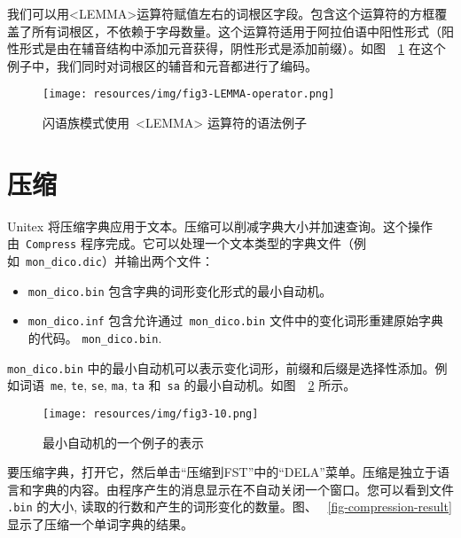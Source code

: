 \bigskip
\noindent 
我们可以用<LEMMA>运算符赋值左右的词根区字段。包含这个运算符的方框覆盖了所有词根区，不依赖于字母数量。这个运算符适用于阿拉伯语中阳性形式（阳性形式是由在辅音结构中添加元音获得，阴性形式是添加前缀）。如图\ ~\ref{LEMMA-operator} 在这个例子中，我们同时对词根区的辅音和元音都进行了编码。


\begin{figure}[!ht]
\begin{center}
\texttt{[image: resources/img/fig3-LEMMA-operator.png]}
\caption{闪语族模式使用\ <LEMMA>\label{LEMMA-operator} 运算符的语法例子}
\end{center}
\end{figure}

\section{压缩}

Unitex 将压缩字典应用于文本。压缩可以削减字典大小并加速查询。这个操作由\ \verb+Compress+ 程序完成。它可以处理一个文本类型的字典文件（例如\ \verb+mon_dico.dic+）并输出两个文件：


\begin{itemize}
  \item \verb+mon_dico.bin+ 包含字典的词形变化形式的最小自动机。
  \item \verb+mon_dico.inf+ 包含允许通过\ \verb+mon_dico.bin+ 文件中的变化词形重建原始字典的代码。 \verb+mon_dico.bin+.
\end{itemize}

\noindent
\verb+mon_dico.bin+ 中的最小自动机可以表示变化词形，前缀和后缀是选择性添加。例如词语\ \verb+me+, \verb+te+, \verb+se+,
\verb+ma+, \verb+ta+ 和\ \verb+sa+ 的最小自动机。如图\ ~\ref{fig-example-minimal-automaton} 所示。

\bigskip \begin{figure}[!h]
\begin{center}
\texttt{[image: resources/img/fig3-10.png]}
\caption{最小自动机的一个例子的表示\label{fig-example-minimal-automaton}}
\end{center}
\end{figure}

\noindent 要压缩字典，打开它，然后单击“压缩到FST”中的“DELA”菜单。压缩是独立于语言和字典的内容。由程序产生的消息显示在不自动关闭一个窗口。您可以看到文件
\verb+.bin+ 的大小, 读取的行数和产生的词形变化的数量。图、 ~\ref{fig-compression-result} 显示了压缩一个单词字典的结果。

